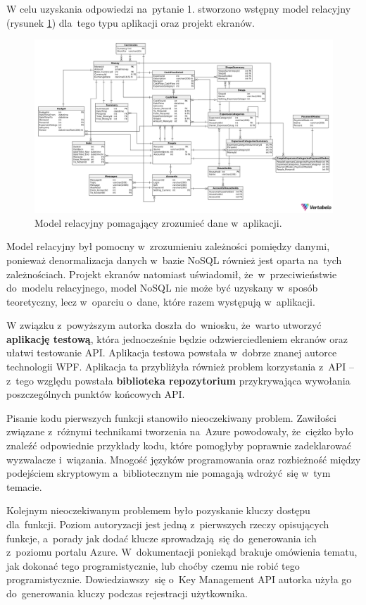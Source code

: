\documentclass[12pt,a4paper,twoside,titlepage,openright]{book}
\begin{document}
W celu uzyskania odpowiedzi na~pytanie 1. stworzono wstępny model relacyjny (rysunek \ref{fig:model-relacyjny}) dla~tego typu aplikacji oraz projekt ekranów. 

\begin{figure}[h]
	\centering
			\includegraphics[width=\textwidth]{model-relacyjny.png}
		\caption{Model relacyjny pomagający zrozumieć dane w~aplikacji.}
		\label{fig:model-relacyjny}
\end{figure}

Model relacyjny był pomocny w~zrozumieniu zależności pomiędzy danymi, ponieważ denormalizacja danych w~bazie NoSQL również jest oparta na~tych zależnościach. Projekt ekranów natomiast uświadomił, że~w~przeciwieństwie do~modelu relacyjnego, model NoSQL nie może być uzyskany w~sposób teoretyczny, lecz w~oparciu o~dane, które razem występują w~aplikacji.

W związku z~powyższym autorka doszła do~wniosku, że~warto utworzyć \textbf{aplikację testową}, która jednocześnie będzie odzwierciedleniem ekranów oraz ułatwi testowanie API. Aplikacja testowa powstała w~dobrze znanej autorce technologii WPF. Aplikacja ta przybliżyła również problem korzystania z~API -- z~tego względu powstała \textbf{biblioteka repozytorium} przykrywająca wywołania poszczególnych punktów końcowych API. 

Pisanie kodu pierwszych funkcji stanowiło nieoczekiwany problem. Zawiłości związane z~różnymi technikami tworzenia na~Azure powodowały, że~ciężko było znaleźć odpowiednie przykłady kodu, które pomogłyby poprawnie zadeklarować wyzwalacze i~wiązania. Mnogość języków programowania oraz rozbieżność między podejściem skryptowym a~bibliotecznym nie pomagają wdrożyć~się w~tym temacie.

Kolejnym nieoczekiwanym problemem było pozyskanie kluczy dostępu dla~funkcji. Poziom autoryzacji jest jedną z~pierwszych rzeczy opisujących funkcje, a~porady jak dodać klucze sprowadzają~się do~generowania ich z~poziomu portalu Azure. W~dokumentacji poniekąd brakuje omówienia tematu, jak dokonać tego programistycznie, lub choćby czemu nie robić tego programistycznie. Dowiedziawszy~się o~Key Management API autorka użyła go do~generowania kluczy podczas rejestracji użytkownika.
\end{document}
